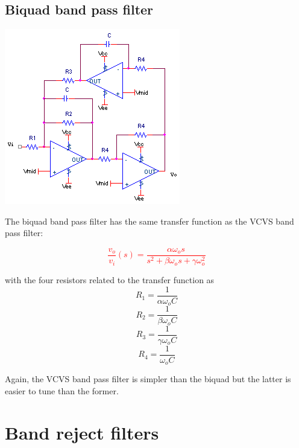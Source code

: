 \subsection{Biquad band pass filter}
\begin{center}
	\includegraphics{schematics/biquad_bandpass.PNG}
\end{center}
The biquad band pass filter has the same transfer function as the VCVS band pass filter:

\textcolor{red}{
\begin{equation}
\frac{v_{o}}{v_{i}}(s) = \frac{\alpha \omega_{o}s}{s^{2}+\beta \omega_{o}s + \gamma \omega_{o}^{2}}
\label{eq:biquad_bandpass}
\end{equation}
}

with the four resistors related to the transfer function as
\begin{equation}
R_1 = \frac{1}{\alpha \omega_{o}C}
\end{equation}
\begin{equation}
R_2 = \frac{1}{\beta \omega_{o}C}
\end{equation}
\begin{equation}
R_3 = \frac{1}{\gamma \omega_{o}C}
\end{equation}
\begin{equation}
R_4 = \frac{1}{\omega_{o}C}
\end{equation}

Again, the VCVS band pass filter is simpler than the biquad but the latter is easier to tune than the former. \autocite[140]{op-amp-circuits-johnson}

\section{Band reject filters}

